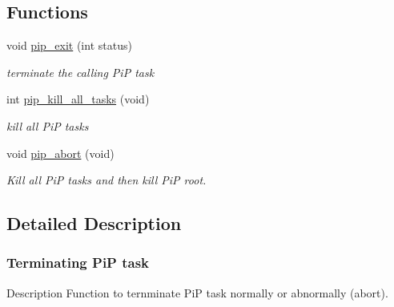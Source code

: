 \documentclass[twoside]{book}
\begin{document}
\subsection*{Functions}
\begin{DoxyCompactItemize}
\item 
void \hyperlink{group__pip-2-exit_ga55171ea8db2c2693f005560e427485c2}{pip\-\_\-exit} (int status)
\begin{DoxyCompactList}\small\item\em terminate the calling Pi\-P task \end{DoxyCompactList}\item 
int \hyperlink{group__pip-2-exit_gab7ba5cc62101240c68acf07905e36772}{pip\-\_\-kill\-\_\-all\-\_\-tasks} (void)
\begin{DoxyCompactList}\small\item\em kill all Pi\-P tasks \end{DoxyCompactList}\item 
void \hyperlink{group__pip-2-exit_ga49a4a9ee014ffdaf0c26df18adf965ad}{pip\-\_\-abort} (void)
\begin{DoxyCompactList}\small\item\em Kill all Pi\-P tasks and then kill Pi\-P root. \end{DoxyCompactList}\end{DoxyCompactItemize}


\subsection{Detailed Description}
\hypertarget{pip-exit}{}\subsubsection{Terminating Pi\-P task}\label{pip-exit}
\begin{DoxyParagraph}{Description}
Function to ternminate Pi\-P task normally or abnormally (abort). 
\end{DoxyParagraph}
\end{document}
